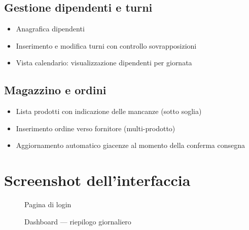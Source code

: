 \subsection{Gestione dipendenti e turni}
\begin{itemize}
  \item Anagrafica dipendenti
  \item Inserimento e modifica turni con controllo sovrapposizioni
  \item Vista calendario: visualizzazione dipendenti per giornata
\end{itemize}

\subsection{Magazzino e ordini}
\begin{itemize}
  \item Lista prodotti con indicazione delle mancanze (sotto soglia)
  \item Inserimento ordine verso fornitore (multi-prodotto)
  \item Aggiornamento automatico giacenze al momento della conferma consegna
\end{itemize}

\section{Screenshot dell'interfaccia}

\begin{figure}[H]
  \centering
  \caption{Pagina di login}
  \label{fig:screen-login}
\end{figure}

\begin{figure}[H]
  \centering
  \caption{Dashboard --- riepilogo giornaliero}
  \label{fig:screen-dashboard}
\end{figure}

